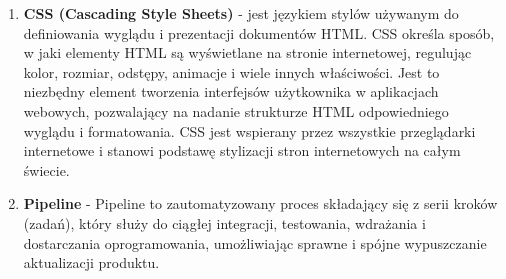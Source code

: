 \begin{enumerate}
    \item {\bf CSS (Cascading Style Sheets)} - jest językiem stylów używanym do definiowania wyglądu i prezentacji dokumentów HTML. CSS określa sposób, w jaki elementy HTML są wyświetlane na stronie internetowej, regulując kolor, rozmiar, odstępy, animacje i wiele innych właściwości. Jest to niezbędny element tworzenia interfejsów użytkownika w aplikacjach webowych, pozwalający na nadanie strukturze HTML odpowiedniego wyglądu i formatowania. CSS jest wspierany przez wszystkie przeglądarki internetowe i stanowi podstawę stylizacji stron internetowych na całym świecie.

    \item {\bf Pipeline} - Pipeline to zautomatyzowany proces składający się z serii kroków (zadań), który służy do ciągłej integracji, testowania, wdrażania i dostarczania oprogramowania, umożliwiając sprawne i spójne wypuszczanie aktualizacji produktu.
     
 \end{enumerate}